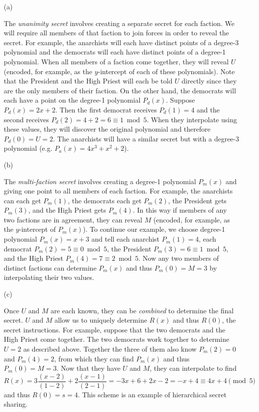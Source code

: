 \documentclass[]{article}
\begin{document}
\begin{qunlist}
{{\begin{enumerate}

\item[(a)]

The \textit{unanimity secret} involves creating a separate secret for each faction. We will require all members of that faction to join forces in order to reveal the secret. For example, the anarchists will each have distinct points of a degree-3 polynomial and the democrats will each have distinct points of a degree-1 polynomial. When all members of a faction come together, they will reveal $U$ (encoded, for example, as the $y$-intercept of each of these polynomials). Note that the President and the High Priest will each be told $U$ directly since they are the only members of their faction.
On the other hand, the democrats will each have a point on the degree-1 polynomial $P_d(x)$. Suppose $P_d(x) = 2x+2$. Then the first democrat receives $P_d(1) = 4$ and the second receives $P_d(2) = 4+2 = 6 \equiv 1 \bmod 5$. When they interpolate using these values, they will discover the original polynomial and therefore $P_d(0) = U = 2$. The anarchists will have a similar secret but with a degree-3 polynomial (e.g. $P_a(x) = 4x^3 + x^2 + 2$).

\item[(b)]

The \textit{multi-faction secret} involves creating a degree-1 polynomial $P_m(x)$ and giving one point to all members of each faction. For example, the anarchists can each get $P_m(1)$, the democrats each get $P_m(2)$, the President gets $P_m(3)$, and the High Priest gets $P_m(4)$. In this way if members of any two factions are in agreement, they can reveal $M$ (encoded, for example, as the $y$-intercept of $P_m(x)$). To continue our example, we choose degree-1 polynomial $P_m(x) = x+3$ and tell each anarchist $P_m(1)=4$, each democrat $P_m(2)=5\equiv0 \bmod 5$, the President $P_m(3)=6 \equiv 1 \bmod 5$, and the High Priest $P_m(4) = 7 \equiv 2 \bmod 5$. Now any two members of distinct factions can determine $P_m(x)$ and thus $P_m(0) = M = 3$ by interpolating their two values.

\item[(c)]

Once $U$ and $M$ are each known, they can be \textit{combined} to determine the final secret. $U$ and $M$ allow us to uniquely determine $R(x)$ and thus $R(0)$, the secret instructions. For example, suppose that the two democrats and the High Priest come together. The two democrats work together to determine $U=2$ as described above. Together the three of them also know $P_m(2)=0$ and $P_m(4)=2$, from which they can find $P_m(x)$ and thus $P_m(0) = M=3$. Now that they have $U$ and $M$, they can interpolate to find 
\[ R(x) = 3 \frac{(x-2)}{(1-2)} + 2 \frac{(x-1)}{(2-1)} = -3x+6 + 2x-2 = -x + 4 \equiv 4x + 4 \pmod 5 \]
and thus $R(0) = s = 4$. This scheme is an example of hierarchical secret sharing. 


\end{enumerate}}}
\end{qunlist}
\end{document}
